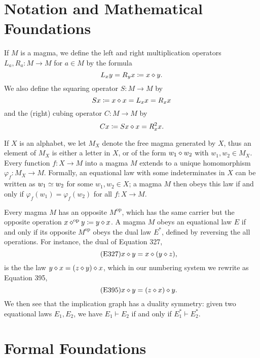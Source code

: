 \section{Notation and Mathematical Foundations}

If $M$ is a magma, we define the left and right multiplication operators $L_a, R_a \colon M \to M$ for $a \in M$ by the formula
\begin{equation}\label{left-right}
    L_x y = R_y x \coloneqq x \diamond y.
\end{equation}
We also define the squaring operator $S \colon M \to M$ by
\begin{equation}\label{square-def}
    Sx \coloneqq x \diamond x = L_x x = R_x x
\end{equation}
and the (right) cubing operator $C \colon M \to M$ by
\begin{equation}\label{cube-def}
    Cx \coloneqq Sx \diamond x = R_x^2 x.
\end{equation}

If $X$ is an alphabet, we let $M_X$ denote the free magma generated by $X$, thus an element of $M_X$ is either a letter in $X$, or of the form $w_1 \diamond w_2$ with $w_1,w_2 \in M_X$.  Every function $f \colon X \to M$ into a magma $M$ extends to a unique homomorphism $\varphi_f \colon M_X \to M$.  Formally, an equational law with some indeterminates in $X$ can be written as $w_1 \simeq w_2$ for some $w_1, w_2 \in X$; a magma $M$ then obeys this law if and only if $\varphi_f(w_1) = \varphi_f(w_2)$ for all $f \colon X \to M$.

Every magma $M$ has an opposite $M^{\mathrm{op}}$, which has the same carrier but the opposite operation $x \diamond^{\mathrm{op}} y \coloneqq y \diamond x$.  A magma $M$ obeys an equational law $E$ if and only if its opposite $M^{\mathrm{op}}$ obeys the dual law $E^*$, defined by reversing the all operations.  For instance, the dual of Equation 327,
\begin{equation}\label{eq327}\tag{E327}
    x \diamond y = x \diamond (y \diamond z),
\end{equation}
is the the law $y \diamond x = (z \diamond y) \diamond x$, which in our numbering system we rewrite as Equation 395,
\begin{equation}\label{eq395}\tag{E395}
    x \diamond y = (z \diamond x) \diamond y.
\end{equation}
We then see that the implication graph has a duality symmetry: given two equational laws $E_1,E_2$, we have $E_1 \vdash E_2$ if and only if $E_1^* \vdash E_2^*$.

\section{Formal Foundations}

